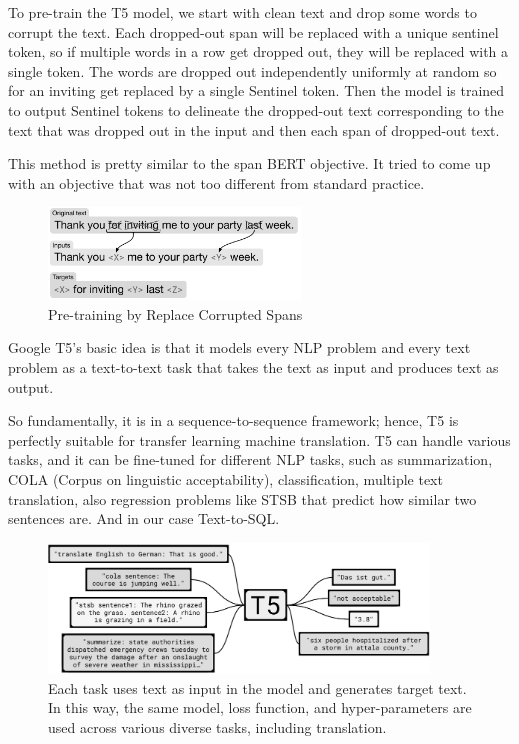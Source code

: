 To pre-train the T5 model, we start with clean text and drop some words to corrupt the text. Each dropped-out span will be replaced with a unique sentinel token, so if multiple words in a row get dropped out, they will be replaced with a single token. The words are dropped out independently uniformly at random so for an inviting get replaced by a single Sentinel token. Then the model is trained to output Sentinel tokens to delineate the dropped-out text corresponding to the text that was dropped out in the input and then each span of dropped-out text.

This method is pretty similar to the span BERT objective. It tried to come up with an objective that was not too different from standard practice.

\begin{figure}[h]
    \centering
    \includegraphics[width=0.6\textwidth]{pics/picard/t5-fine.png}
    \caption{Pre-training by Replace Corrupted Spans \cite{raffel_exploring_2020}}
\end{figure}

Google T5's basic idea is that it models every NLP problem and every text problem as a text-to-text task that takes the text as input and produces text as output.

So fundamentally, it is in a sequence-to-sequence framework; hence, T5 is perfectly suitable for transfer learning machine translation.
T5 can handle various tasks, and it can be fine-tuned for different NLP tasks, such as summarization, COLA (Corpus on linguistic acceptability), classification, multiple text translation, also regression problems like STSB  that predict how similar two sentences are. And in our case Text-to-SQL.

\begin{figure}[h]
    \centering
    \includegraphics[width=0.9\textwidth]{pics/picard/t5-task.png}
    \caption{Each task uses text as input in the model and generates target text. In this way, the same model, loss function, and hyper-parameters are used across various diverse tasks, including translation. \cite{raffel_exploring_2020}}
\end{figure}

